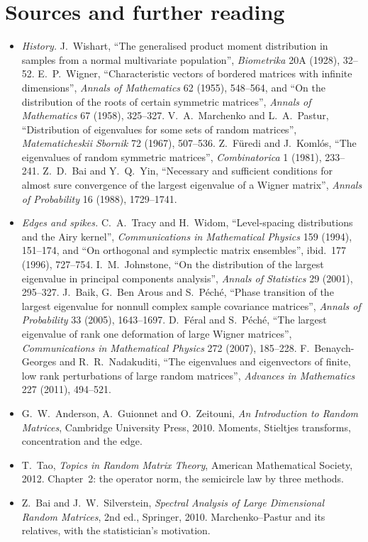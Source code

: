 \section*{Sources and further reading}

\begin{itemize}
\item \emph{History.} J.~Wishart, ``The generalised product moment distribution in samples from a normal multivariate population'', \emph{Biometrika} 20A (1928), 32--52. E.~P.~Wigner, ``Characteristic vectors of bordered matrices with
infinite dimensions'', \emph{Annals of Mathematics} 62 (1955), 548--564, and ``On the distribution of the roots of certain symmetric matrices'', \emph{Annals of Mathematics} 67 (1958), 325--327. V.~A.~Marchenko and L.~A.~Pastur,
``Distribution of eigenvalues for some sets of random matrices'', \emph{Matematicheskii Sbornik} 72 (1967), 507--536. Z.~F\"uredi and J.~Koml\'os, ``The eigenvalues of random symmetric matrices'', \emph{Combinatorica} 1 (1981),
233--241. Z.~D.~Bai and Y.~Q.~Yin, ``Necessary and sufficient conditions for almost sure convergence of the largest eigenvalue of a Wigner matrix'', \emph{Annals of Probability} 16 (1988), 1729--1741.
\item \emph{Edges and spikes.} C.~A.~Tracy and H.~Widom, ``Level-spacing distributions and the Airy kernel'', \emph{Communications in Mathematical Physics} 159 (1994), 151--174, and ``On orthogonal and symplectic matrix ensembles'',
ibid.\ 177 (1996), 727--754. I.~M.~Johnstone, ``On the distribution of the largest eigenvalue in principal components analysis'', \emph{Annals of Statistics} 29 (2001), 295--327. J.~Baik, G.~Ben Arous and S.~P\'ech\'e, ``Phase transition
of the largest eigenvalue for nonnull complex sample covariance matrices'', \emph{Annals of Probability} 33 (2005), 1643--1697. D.~F\'eral and S.~P\'ech\'e, ``The largest eigenvalue of rank one deformation of large Wigner matrices'',
\emph{Communications in Mathematical Physics} 272 (2007), 185--228. F.~Benaych-Georges and R.~R.~Nadakuditi, ``The eigenvalues and eigenvectors of finite, low rank perturbations of large random matrices'', \emph{Advances in
Mathematics} 227 (2011), 494--521.
\item G.~W.~Anderson, A.~Guionnet and O.~Zeitouni, \emph{An Introduction to Random Matrices}, Cambridge University Press, 2010. Moments, Stieltjes transforms, concentration and the edge.
\item T.~Tao, \emph{Topics in Random Matrix Theory}, American Mathematical Society, 2012. Chapter~2: the operator norm, the semicircle law by three methods.
\item Z.~Bai and J.~W.~Silverstein, \emph{Spectral Analysis of Large Dimensional Random Matrices}, 2nd ed., Springer, 2010. Marchenko--Pastur and its relatives, with the statistician's motivation.
\end{itemize}
